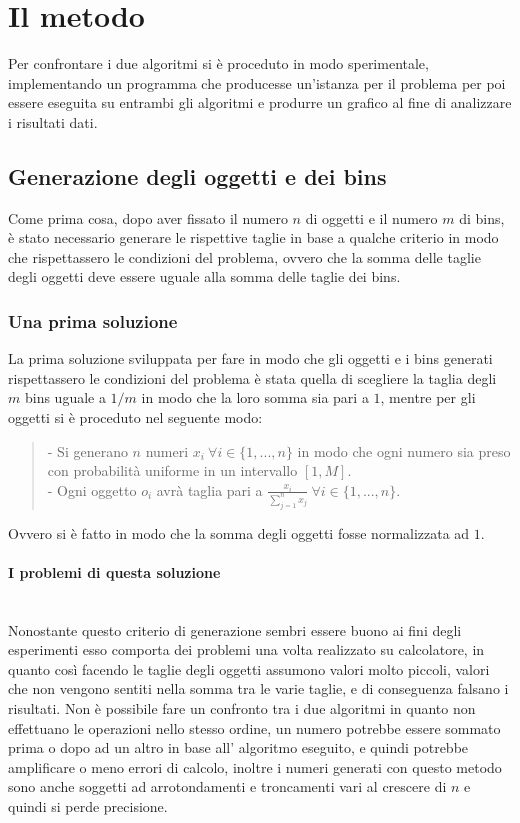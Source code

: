 \section{Il metodo}
Per confrontare i due algoritmi si è proceduto in modo sperimentale, implementando un programma che producesse
un'istanza per il problema per poi essere eseguita su entrambi gli algoritmi e produrre un grafico al fine di 
analizzare i risultati dati. 

\subsection{Generazione degli oggetti e dei bins}
Come prima cosa, dopo aver fissato il numero $ n $ di oggetti e il numero $ m $ di bins, è stato necessario generare le rispettive taglie
in base a qualche criterio in modo che rispettassero le condizioni del problema, ovvero che la somma delle taglie degli oggetti 
deve essere uguale alla somma delle taglie dei bins.

\subsubsection{Una prima soluzione}
La prima soluzione sviluppata per fare in modo che gli oggetti e i bins generati rispettassero le condizioni del problema
è stata quella di scegliere la taglia degli $ m $ bins uguale a $ 1/m $ in modo che la loro somma sia pari a $ 1 $, mentre
per gli oggetti si è proceduto nel seguente modo:
\begin{quote}
	- Si generano $ n $ numeri $ x_i \: \forall i \in \{1, ..., n\} $ in modo che ogni numero sia preso con probabilità 
	uniforme in un intervallo $ [1, M] $. \\
	- Ogni oggetto $ o_i $ avrà taglia pari a $ \displaystyle\frac{x_i}{\sum_{j=1}^n x_j} \: \forall i \in \{1, ..., n\} $.
\end{quote}
Ovvero si è fatto in modo che la somma degli oggetti fosse normalizzata ad $ 1 $.

\paragraph{I problemi di questa soluzione}\mbox{}\\
Nonostante questo criterio di generazione sembri essere buono ai fini degli esperimenti esso comporta dei problemi una volta
realizzato su calcolatore, in quanto così facendo le taglie degli oggetti assumono valori molto piccoli, valori che non vengono
sentiti nella somma tra le varie taglie, e di conseguenza falsano i risultati. Non è possibile fare un confronto tra i due algoritmi
in quanto non effettuano le operazioni nello stesso ordine, un numero potrebbe essere sommato prima o dopo ad un altro in base all'
algoritmo eseguito, e quindi potrebbe amplificare o meno errori di calcolo, inoltre i numeri generati con questo metodo sono
anche soggetti ad arrotondamenti e troncamenti vari al crescere di $ n $ e quindi si perde precisione.


